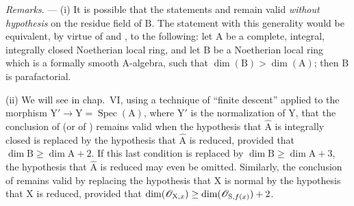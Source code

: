 \begin{env}[21.14.4]
\label{IV.21.14.4}
\emph{Remarks}. ---
(i) It is possible that the statements  and  remain valid \emph{without hypothesis} on the residue field of $\mathrm{B}$.
The statement with this generality would be equivalent, by virtue of  and , to the following: let $\mathrm{A}$ be a complete, integral, integrally closed Noetherian local ring, and let $\mathrm{B}$ be a Noetherian local ring which is a formally smooth $\mathrm{A}$-algebra, such that $\dim(\mathrm{B})>\dim(\mathrm{A})$; then $\mathrm{B}$ is parafactorial.

(ii) We will see in chap.~VI, using a technique of ``finite descent'' applied to the morphism $\mathrm{Y}'\to\mathrm{Y}=\operatorname{Spec}(\mathrm{A})$, where $\mathrm{Y}'$ is the normalization of $\mathrm{Y}$, that the conclusion of  (or of ) remains valid when the hypothesis that $\widehat{\mathrm{A}}$ is integrally closed is replaced by the hypothesis that $\widehat{\mathrm{A}}$ is reduced, provided that $\dim\mathrm{B}\geq\dim\mathrm{A}+2$.
If this last condition is replaced by $\dim\mathrm{B}\geq\dim\mathrm{A}+3$, the hypothesis that $\widehat{\mathrm{A}}$ is reduced may even be omitted.
Similarly, the conclusion of  remains valid by replacing the hypothesis that $\mathrm{X}$ is normal by the hypothesis that $\mathrm{X}$ is reduced, provided that $\dim(\mathscr{O}_{\mathrm{X},x})\geq\dim(\mathscr{O}_{\mathrm{S},f(x)})+2$.


\end{env}
